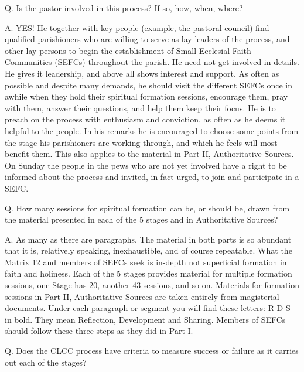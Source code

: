 \documentclass[oneside]{book}
\begin{document}
Q. Is the pastor involved in this process? If so, how, when, where?

A. YES! He together with key people (example, the pastoral council) find
qualified parishioners who are willing to serve as lay leaders of the process,
and other lay persons to begin the establishment of Small Ecclesial Faith
Communities (SEFCs) throughout the parish. He need not get involved in
details. He gives it leadership, and above all shows interest and support.  As
often as possible and despite many demands, he should visit the different SEFCs
once in awhile when they hold their spiritual formation sessions, encourage
them, pray with them, answer their questions, and help them keep their focus.
He is to preach on the process with enthusiasm and conviction, as often as he
deems it helpful to the people. In his remarks he is encouraged to choose some
points from the stage his parishioners are working through, and which he feels
will most benefit them. This also applies to the material in Part II,
Authoritative Sources. On Sunday the people in the pews who are not yet involved
have a right to be informed about the process and invited, in fact urged, to
join and participate in a SEFC.


Q. How many sessions for spiritual formation can be, or should be, drawn from
the material presented in each of the 5 stages and in Authoritative Sources?

A. As many as there are paragraphs. The material in both parts is so abundant
that it is, relatively speaking, inexhaustible, and of course repeatable. What
the Matrix 12 and members of SEFCs seek is in-depth not superficial formation in
faith and holiness. Each of the 5 stages provides material for multiple
formation sessions, one Stage has 20, another 43 sessions, and so on.  Materials
for formation sessions in Part II, Authoritative Sources are taken entirely from
magisterial documents. Under each paragraph or segment you will find these
letters: R-D-S in bold. They mean Reflection, Development and Sharing. Members
of SEFCs should follow these three steps as they did in Part I.


Q. Does the CLCC process have criteria to measure success or failure as it
carries out each of the stages?
\end{document}
